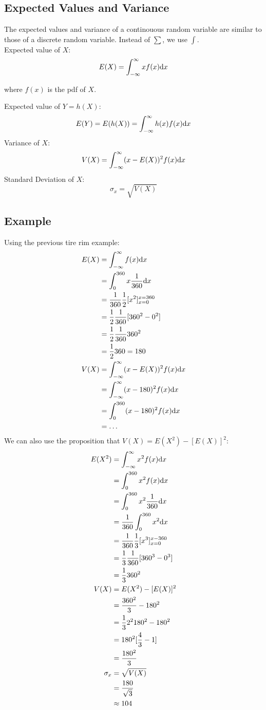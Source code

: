 \documentclass[letterpaper, 12pt]{math}
\begin{document}
\subsection*{Expected Values and Variance}
The expected values and variance of a continouous random variable are similar
to those of a discrete random variable. Instead of \( \sum \), we use
\( \int \). \\
Expected value of \( X \):
\[ E(X) = \int_{-\infty}^{\infty}xf(x)\mathrm{d}{x} \]
\begin{center}
where \( f(x) \) is the pdf of \( X \).
\end{center}
Expected value of \( Y = h(X) \):
\[ E(Y) = E(h(X)) = \int_{-\infty}^{\infty}h(x)f(x)\mathrm{d}{x} \]
Variance of \( X \):
\[ V(X) = \int_{-\infty}^{\infty}(x-E(X))^{2}f(x)\mathrm{d}{x} \]
Standard Deviation of \( X \):
\[ \sigma_{x} = \sqrt{V(X)} \]

\subsection*{Example}
Using the previous tire rim example:
\begin{align*}
  E(X) &= \int_{-\infty}^{\infty}f(x)\mathrm{d}{x} \\
  &= \int_{0}^{360}x\frac{1}{360}\mathrm{d}{x} \\
  &= \frac{1}{360}\frac{1}{2}[x^{2}]_{x=0}^{x=360} \\
  &= \frac{1}{2}\frac{1}{360}[360^{2}-0^{2}] \\
  &= \frac{1}{2}\frac{1}{360}360^{2} \\
  &= \frac{1}{2}360 = 180 \\
  V(X) &= \int_{-\infty}^{\infty}(x-E(X))^{2}f(x)\mathrm{d}{x} \\
  &= \int_{-\infty}^{\infty}(x-180)^{2}f(x)\mathrm{d}{x} \\
  &= \int_{0}^{360}(x-180)^{2}f(x)\mathrm{d}{x} \\
  &= \dots
\end{align*}
We can also use the proposition that \( V(X) = E(X^{2})-[E(X)]^{2} \):
\begin{align*}
  E(X^{2}) &= \int_{-\infty}^{\infty}x^{2}f(x)\mathrm{d}{x} \\
  &= \int_{0}^{360}x^{2}f(x)\mathrm{d}{x} \\
  &= \int_{0}^{360}x^{2}\frac{1}{360}\mathrm{d}{x} \\
  &= \frac{1}{360}\int_{0}^{360}x^{2}\mathrm{d}{x} \\
  &= \frac{1}{360}\frac{1}{3}[x^{3}]_{x=0}^{x-360} \\
  &= \frac{1}{3}\frac{1}{360}[360^{3}-0^{3}] \\
  &= \frac{1}{3}360^{2} \\
  V(X) &= E(X^{2})-[E(X)]^{2} \\
  &= \frac{360^{2}}{3}-180^{2} \\
  &= \frac{1}{3}2^{2}180^{2}-180^{2} \\
  &= 180^{2}[\frac{4}{3}-1] \\
  &= \frac{180^{2}}{3} \\
  \sigma_{x} &= \sqrt{V(X)} \\
  &= \frac{180}{\sqrt{3}} \\
  &\approx 104
\end{align*}
\end{document}

